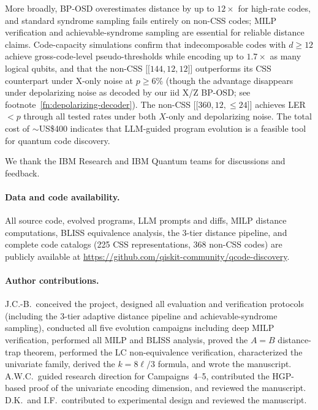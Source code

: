 \documentclass[aps,prxquantum,twocolumn,superscriptaddress,nofootinbib]{revtex4-2}
\newcommand{\dblbrk}[1]{\ensuremath{\lbrack\!\lbrack #1 \rbrack\!\rbrack}}
\newcommand{\code}[1]{\dblbrk{#1}}
\begin{document}
More broadly, BP-OSD overestimates distance by up to $12\times$ for high-rate codes, and standard syndrome sampling fails entirely on non-CSS codes; MILP verification and achievable-syndrome sampling are essential for reliable distance claims.
Code-capacity simulations confirm that indecomposable codes with $d \geq 12$ achieve gross-code-level pseudo-thresholds while encoding up to $1.7\times$ as many logical qubits, and that the non-CSS $\code{144,12,12}$ outperforms its CSS counterpart under X-only noise at $p \geq 6\%$ (though the advantage disappears under depolarizing noise as decoded by our iid X/Z BP-OSD; see footnote~\ref{fn:depolarizing-decoder}).
The non-CSS $\code{360,12,{\leq}24}$ achieves LER~$< p$ through all tested rates under both $X$-only and depolarizing noise.
The total cost of ${\sim}$US\$400 indicates that LLM-guided program evolution is a feasible tool for quantum code discovery.

\begin{acknowledgments}
We thank the IBM Research and IBM Quantum teams for discussions and feedback.
\end{acknowledgments}

\paragraph{Data and code availability.}
All source code, evolved programs, LLM prompts and diffs, MILP distance computations, BLISS equivalence analysis, the 3-tier distance pipeline, and complete code catalogs (225 CSS representations, 368 non-CSS codes) are publicly available at \cite{cruzbenito2026qcode} \url{https://github.com/qiskit-community/qcode-discovery}.

\paragraph{Author contributions.}
J.C.-B.\ conceived the project, designed all evaluation and verification protocols (including the 3-tier adaptive distance pipeline and achievable-syndrome sampling), conducted all five evolution campaigns including deep MILP verification, performed all MILP and BLISS analysis, proved the $A = B$ distance-trap theorem, performed the LC non-equivalence verification, characterized the univariate family, derived the $k = 8\ell/3$ formula, and wrote the manuscript.
A.W.C.\ guided research direction for Campaigns~4--5, contributed the HGP-based proof of the univariate encoding dimension, and reviewed the manuscript.
D.K.\ and I.F.\ contributed to experimental design and reviewed the manuscript.
\end{document}
